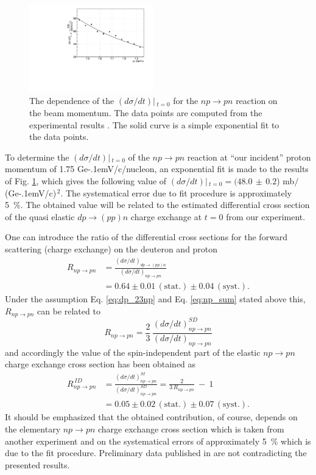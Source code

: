 \documentclass[twocolumn,epjc3]{svjour3}
\newcommand{\np}     {\ensuremath{np \rightarrow pn}\xspace}
\newcommand{\dpchex} {\ensuremath{dp \rightarrow (pp)n}\xspace}
\newcommand{\GeVc}   {Ge\kern-.1emV/c\xspace}
\begin{document}
\begin{figure}[ht]
  \centering
  \includegraphics[width=0.48\textwidth]{np_dSigma.pdf}
  \caption{The dependence of the $(d\sigma/dt)|\,_{t=0}$ for the \np reaction on
    the beam momentum. The data points are computed from the experimental
    results \cite{biz75}. The solid curve is a simple exponential fit to the
    data points.}
  \label{fig:npsigma}
\end{figure}

To determine the $(d\sigma/dt)|\,_{t=0}$ of the \np reaction at ``our incident''
proton momentum of 1.75 \GeVc/nucleon, an exponential fit is made to the results
of Fig. \ref{fig:npsigma}, which gives the following value of
$(d\sigma/dt)|\,_{t=0} = (48.0\,\pm\,0.2$) mb$/$(\GeVc)$^{\,2}$. The systematical
error due to fit procedure is approximately 5~\%. The obtained value will be
related to the estimated differential cross section of the quasi elastic \dpchex
charge exchange at $t=0$ from our experiment.

One can introduce the ratio of the differential cross sections for the forward
scattering (charge exchange) on the deuteron and proton
\begin{equation}
  \begin{split}
    R_{\np} &= \frac{(d\sigma/dt)_{\dpchex}}{(d\sigma/dt)_{\np}} \\
    &= 0.64 \pm 0.01\,\mathrm{(stat.)} \pm 0.04\,\mathrm{(syst.)}.
  \end{split}
\end{equation}
Under the assumption Eq. \eqref{eq:dp_23np} and Eq. \eqref{eq:np_sum} stated
above this, $R_{\np}$ can be related to
\begin{equation}
  R_{\np} = \frac{2}{3}\,\frac{(d\sigma/dt)^{SD}_{\np}}{(d\sigma/dt)_{\np}}
\end{equation}
and accordingly the value of the spin-independent part of the elastic \np charge
exchange cross section has been obtained as
\begin{equation}
  \begin{split}
    R^{\,ID}_{\np} &= \frac{(d\sigma/dt)^{SI}_{\np}}{(d\sigma/dt)^{SD}_{\np}}
    = \frac{2}{3\,R_{\np}} \ - \ 1 \\
    &= 0.05 \pm 0.02\,\mathrm{(stat.)} \pm 0.07\,\mathrm{(syst.)}.
  \end{split}
\end{equation}
It should be emphasized that the obtained contribution, of course, depends on
the elementary \np charge exchange cross section which is taken from another
experiment and on the systematical errors of approximately 5~\% which is due to
the fit procedure. Preliminary data published in \cite{bas14,bas16} are not
contradicting the presented results.
\end{document}
